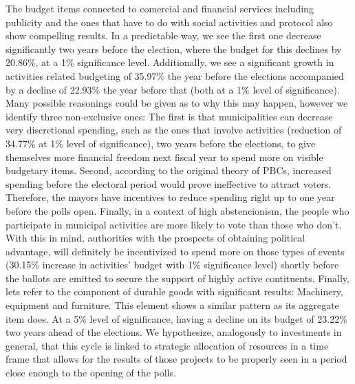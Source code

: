 	The budget items connected to comercial and financial services including publicity and the ones that have to do with social activities and protocol also show compelling results. In a predictable way, we see the first one decrease significantly two years before the election, where the budget for this declines by 20.86\%, at a 1\% significance level. Additionally, we see a significant growth in activities related budgeting of 35.97\% the year before the elections accompanied by a decline of 22.93\% the year before that (both at a 1\% level of significance). Many possible reasonings could be given as to why this may happen, however we identify three non-exclusive ones: The first is that municipalities can decrease very discretional spending, such as the ones that involve activities (reduction of 34.77\% at 1\% level of significance), two years before the elections, to give themselves more financial freedom next fiscal year to spend more on visible budgetary items. Second, according to the original theory of PBCs, increased spending before the electoral period would prove ineffective to attract voters. Therefore, the mayors have incentives to reduce spending right up to one year before the polls open. Finally, in a context of high abstencionism, the people who participate in municipal activities are more likely to vote than those who don’t. With this in mind, authorities with the prospects of obtaining political advantage, will definitely be incentivized to spend more on those types of events (30.15\% increase in activities’ budget with 1\% significance level) shortly before the ballots are emitted to secure the support of highly active contituents.  
	Finally, lets refer to the component of durable goods with significant results: Machinery, equipment and furniture. This element shows a similar pattern as its aggregate item does. At a 5\% level of significance, having a decline on its budget of 23.22\% two years ahead of the elections. We hypothesize, analogously to investments in general, that this cycle is linked to strategic allocation of resources in a time frame that allows for the results of those projects to be properly seen in a period close enough to the opening of the polls.
	


